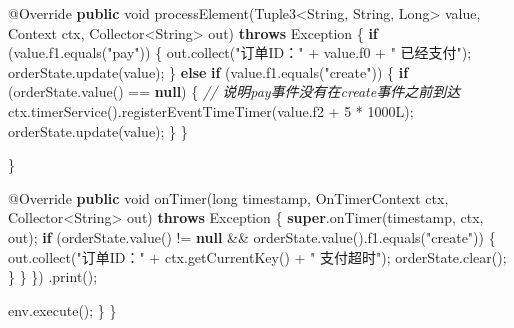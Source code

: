 \documentclass[cn,11pt,chinese]{elegantbook}
\newenvironment{Shaded}{}{}
\newcommand{\AttributeTok}[1]{\textcolor[rgb]{0.49,0.56,0.16}{#1}}
\newcommand{\BuiltInTok}[1]{#1}
\newcommand{\CommentTok}[1]{\textcolor[rgb]{0.38,0.63,0.69}{\textit{#1}}}
\newcommand{\DataTypeTok}[1]{\textcolor[rgb]{0.56,0.13,0.00}{#1}}
\newcommand{\DecValTok}[1]{\textcolor[rgb]{0.25,0.63,0.44}{#1}}
\newcommand{\FunctionTok}[1]{\textcolor[rgb]{0.02,0.16,0.49}{#1}}
\newcommand{\KeywordTok}[1]{\textcolor[rgb]{0.00,0.44,0.13}{\textbf{#1}}}
\newcommand{\NormalTok}[1]{#1}
\newcommand{\StringTok}[1]{\textcolor[rgb]{0.25,0.44,0.63}{#1}}
\begin{document}
\begin{Shaded}
\begin{Highlighting}[]
                \AttributeTok{@Override}
                \KeywordTok{public} \DataTypeTok{void} \FunctionTok{processElement}\NormalTok{(Tuple3\textless{}}\BuiltInTok{String}\NormalTok{, }\BuiltInTok{String}\NormalTok{, }\BuiltInTok{Long}\NormalTok{\textgreater{} value, }\BuiltInTok{Context}\NormalTok{ ctx, Collector\textless{}}\BuiltInTok{String}\NormalTok{\textgreater{} out) }\KeywordTok{throws} \BuiltInTok{Exception}\NormalTok{ \{}
                    \KeywordTok{if}\NormalTok{ (value.}\FunctionTok{f1}\NormalTok{.}\FunctionTok{equals}\NormalTok{(}\StringTok{"pay"}\NormalTok{)) \{}
\NormalTok{                        out.}\FunctionTok{collect}\NormalTok{(}\StringTok{"订单ID："}\NormalTok{ + value.}\FunctionTok{f0}\NormalTok{ + }\StringTok{" 已经支付"}\NormalTok{);}
\NormalTok{                        orderState.}\FunctionTok{update}\NormalTok{(value);}
\NormalTok{                    \} }\KeywordTok{else} \KeywordTok{if}\NormalTok{ (value.}\FunctionTok{f1}\NormalTok{.}\FunctionTok{equals}\NormalTok{(}\StringTok{"create"}\NormalTok{)) \{}
                        \KeywordTok{if}\NormalTok{ (orderState.}\FunctionTok{value}\NormalTok{() == }\KeywordTok{null}\NormalTok{) \{}
                            \CommentTok{// 说明pay事件没有在create事件之前到达}
\NormalTok{                            ctx.}\FunctionTok{timerService}\NormalTok{().}\FunctionTok{registerEventTimeTimer}\NormalTok{(value.}\FunctionTok{f2}\NormalTok{ + }\DecValTok{5}\NormalTok{ * }\DecValTok{1000L}\NormalTok{);}
\NormalTok{                            orderState.}\FunctionTok{update}\NormalTok{(value);}
\NormalTok{                        \}}
\NormalTok{                    \}}

\NormalTok{                \}}

                \AttributeTok{@Override}
                \KeywordTok{public} \DataTypeTok{void} \FunctionTok{onTimer}\NormalTok{(}\DataTypeTok{long}\NormalTok{ timestamp, OnTimerContext ctx, Collector\textless{}}\BuiltInTok{String}\NormalTok{\textgreater{} out) }\KeywordTok{throws} \BuiltInTok{Exception}\NormalTok{ \{}
                    \KeywordTok{super}\NormalTok{.}\FunctionTok{onTimer}\NormalTok{(timestamp, ctx, out);}
                    \KeywordTok{if}\NormalTok{ (orderState.}\FunctionTok{value}\NormalTok{() != }\KeywordTok{null}\NormalTok{ \&\& orderState.}\FunctionTok{value}\NormalTok{().}\FunctionTok{f1}\NormalTok{.}\FunctionTok{equals}\NormalTok{(}\StringTok{"create"}\NormalTok{)) \{}
\NormalTok{                        out.}\FunctionTok{collect}\NormalTok{(}\StringTok{"订单ID："}\NormalTok{ + ctx.}\FunctionTok{getCurrentKey}\NormalTok{() + }\StringTok{" 支付超时"}\NormalTok{);}
\NormalTok{                        orderState.}\FunctionTok{clear}\NormalTok{();}
\NormalTok{                    \}}
\NormalTok{                \}}
\NormalTok{            \})}
\NormalTok{            .}\FunctionTok{print}\NormalTok{();}

\NormalTok{        env.}\FunctionTok{execute}\NormalTok{();}
\NormalTok{    \}}
\NormalTok{\}}
\end{Highlighting}
\end{Shaded}
\end{document}
